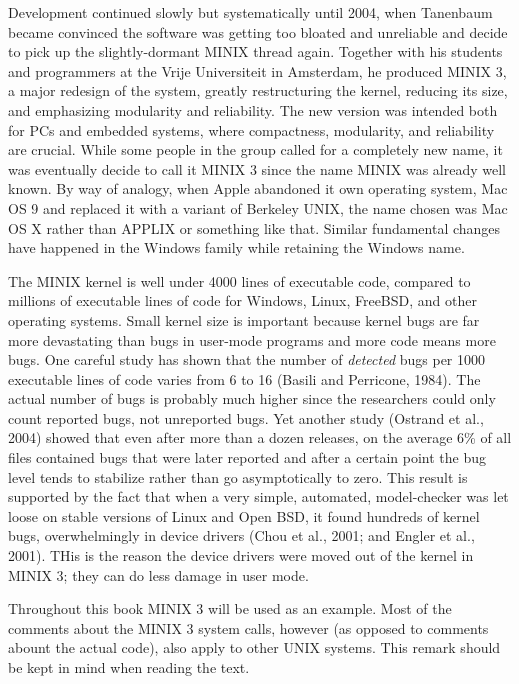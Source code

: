 \documentclass{book}
\newcommand {\sys} [1] {\textsl{#1}}
\begin{document}
Development continued slowly but systematically until 2004, when Tanenbaum became convinced the software was getting too bloated and unreliable
and decide to pick up the slightly-dormant MINIX thread again.
Together with his students and programmers at the Vrije Universiteit in Amsterdam, he produced MINIX 3,
a major redesign of the system, greatly restructuring the kernel, reducing its size, and emphasizing modularity and reliability.
The new version was intended both for PCs and embedded systems, where compactness, modularity, and reliability are crucial.
While some people in the group called for a completely new name, it was eventually decide to call it MINIX 3 
since the name MINIX was already well known.
By way of analogy, when Apple abandoned it own operating system, Mac OS 9 and replaced it with a variant of Berkeley UNIX, 
the name chosen was Mac OS X rather than APPLIX or something like that.
Similar fundamental changes have happened in the Windows family while retaining the Windows name.

The MINIX kernel is well under 4000 lines of executable code, compared to millions of executable lines of code for Windows, Linux, FreeBSD, and other operating systems.
Small kernel size is important because kernel bugs are far more devastating than bugs in user-mode programs and more code means more bugs.
One careful study has shown that the number of \sys{detected} bugs per 1000 executable lines of code varies from 6 to 16 (Basili and Perricone, 1984).
The actual number of bugs is probably much higher since the researchers could only count reported bugs, not unreported bugs.
Yet another study (Ostrand et al., 2004) showed that even after more than a dozen releases, on the average 6\% of all files contained bugs 
that were later reported and after a certain point the bug level tends to stabilize rather than go asymptotically to zero.
This result is supported by the fact that when a very simple, automated, model-checker was let loose on stable versions of Linux and Open BSD, 
it found hundreds of kernel bugs, overwhelmingly in device drivers (Chou et al., 2001; and Engler et al., 2001).
THis is the reason the device drivers were moved out of the kernel in MINIX 3; they can do less damage in user mode.

Throughout this book MINIX 3 will be used as an example.
Most of the comments about the MINIX 3 system calls, however (as opposed to comments abount the actual code), also apply to other UNIX systems.
This remark should be kept in mind when reading the text.
\end{document}
